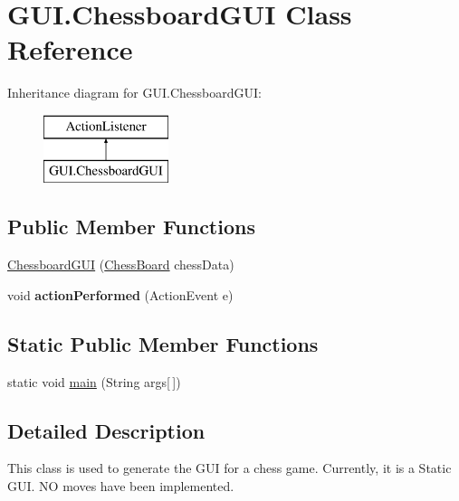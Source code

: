 \hypertarget{class_g_u_i_1_1_chessboard_g_u_i}{}\section{G\+U\+I.\+Chessboard\+G\+UI Class Reference}
\label{class_g_u_i_1_1_chessboard_g_u_i}
Inheritance diagram for G\+U\+I.\+Chessboard\+G\+UI\+:\begin{figure}[H]
\begin{center}
\leavevmode
\includegraphics[height=2.000000cm]{class_g_u_i_1_1_chessboard_g_u_i}
\end{center}
\end{figure}
\subsection*{Public Member Functions}
\begin{DoxyCompactItemize}
\item 
\hyperlink{class_g_u_i_1_1_chessboard_g_u_i_a54614b37f2b48869a626ed8358719682}{Chessboard\+G\+UI} (\hyperlink{class_game_1_1_chess_board}{Chess\+Board} chess\+Data)
\item 
\mbox{\label{class_g_u_i_1_1_chessboard_g_u_i_a83d5802a263c7a8a4a58825f1f60824f}} 
void {\bfseries action\+Performed} (Action\+Event e)
\end{DoxyCompactItemize}
\subsection*{Static Public Member Functions}
\begin{DoxyCompactItemize}
\item 
static void \hyperlink{class_g_u_i_1_1_chessboard_g_u_i_a2ed2bd7b9e65ae8a4e92c27e76b0c14f}{main} (String args\mbox{[}$\,$\mbox{]})
\end{DoxyCompactItemize}


\subsection{Detailed Description}
This class is used to generate the G\+UI for a chess game. Currently, it is a Static G\+UI. NO moves have been implemented. 

